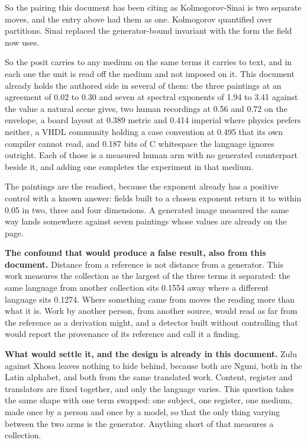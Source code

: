 So the pairing this document has been citing as Kolmogorov-Sinai is two separate moves, and the entry above had them as one. Kolmogorov quantified over partitions. Sinai replaced the generator-bound invariant with the form the field now uses.

So the posit carries to any medium on the same terms it carries to text, and in each one the unit is read off the medium and not imposed on it. This document already holds the authored side in several of them: the three paintings at an agreement of 0.02 to 0.30 and seven at spectral exponents of 1.94 to 3.41 against the value a natural scene gives, two human recordings at 0.56 and 0.72 on the envelope, a board layout at 0.389 metric and 0.414 imperial where physics prefers neither, a VHDL community holding a case convention at 0.495 that its own compiler cannot read, and 0.187 bits of C whitespace the language ignores outright. Each of those is a measured human arm with no generated counterpart beside it, and adding one completes the experiment in that medium.

The paintings are the readiest, because the exponent already has a positive control with a known answer: fields built to a chosen exponent return it to within 0.05 in two, three and four dimensions. A generated image measured the same way lands somewhere against seven paintings whose values are already on the page.

\textbf{The confound that would produce a false result, also from this document.} Distance from a reference is not distance from a generator. This work measures the collection as the largest of the three terms it separated: the same language from another collection sits 0.1554 away where a different language sits 0.1274. Where something came from moves the reading more than what it is. Work by another person, from another source, would read as far from the reference as a derivation might, and a detector built without controlling that would report the provenance of its reference and call it a finding.

\textbf{What would settle it, and the design is already in this document.} Zulu against Xhosa leaves nothing to hide behind, because both are Nguni, both in the Latin alphabet, and both from the same translated work. Content, register and translators are fixed together, and only the language varies. This question takes the same shape with one term swapped: one subject, one register, one medium, made once by a person and once by a model, so that the only thing varying between the two arms is the generator. Anything short of that measures a collection.

